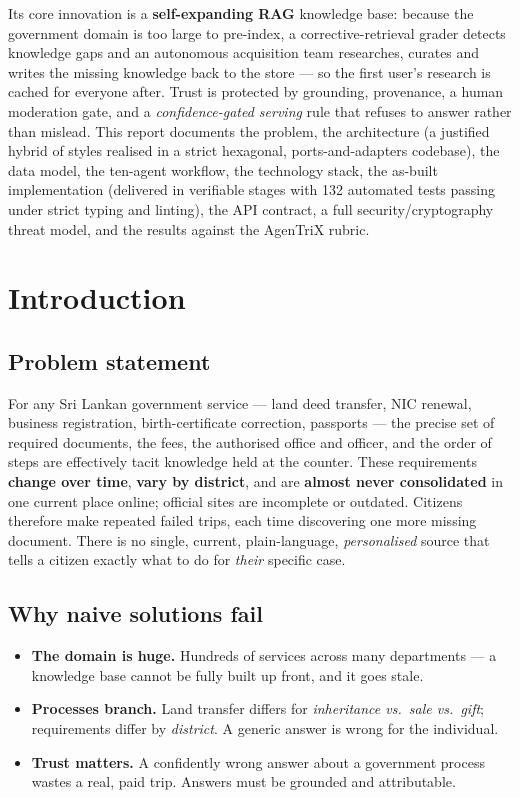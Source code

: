 \documentclass[11pt,a4paper]{article}
\begin{document}
Its core innovation is a \textbf{self-expanding RAG} knowledge base: because the government domain
is too large to pre-index, a corrective-retrieval grader detects knowledge gaps and an autonomous
acquisition team researches, curates and writes the missing knowledge back to the store --- so the
first user's research is cached for everyone after. Trust is protected by grounding, provenance, a
human moderation gate, and a \emph{confidence-gated serving} rule that refuses to answer rather than
mislead. This report documents the problem, the architecture (a justified hybrid of styles realised
in a strict hexagonal, ports-and-adapters codebase), the data model, the ten-agent workflow, the
technology stack, the as-built implementation (delivered in verifiable stages with 132 automated
tests passing under strict typing and linting), the API contract, a full security/cryptography
threat model, and the results against the AgenTriX rubric.

\tableofcontents
\clearpage

\section{Introduction}
\label{sec:intro}

\subsection{Problem statement}
For any Sri Lankan government service --- land deed transfer, NIC renewal, business registration,
birth-certificate correction, passports --- the precise set of required documents, the fees, the
authorised office and officer, and the order of steps are effectively tacit knowledge held at the
counter. These requirements \textbf{change over time}, \textbf{vary by district}, and are
\textbf{almost never consolidated} in one current place online; official sites are incomplete or
outdated. Citizens therefore make repeated failed trips, each time discovering one more missing
document. There is no single, current, plain-language, \emph{personalised} source that tells a
citizen exactly what to do for \emph{their} specific case.

\subsection{Why naive solutions fail}
\begin{itemize}[leftmargin=1.4em]
  \item \textbf{The domain is huge.} Hundreds of services across many departments --- a knowledge
        base cannot be fully built up front, and it goes stale.
  \item \textbf{Processes branch.} Land transfer differs for \emph{inheritance vs.\ sale vs.\ gift};
        requirements differ by \emph{district}. A generic answer is wrong for the individual.
  \item \textbf{Trust matters.} A confidently wrong answer about a government process wastes a real,
        paid trip. Answers must be grounded and attributable.
\end{itemize}
\end{document}
